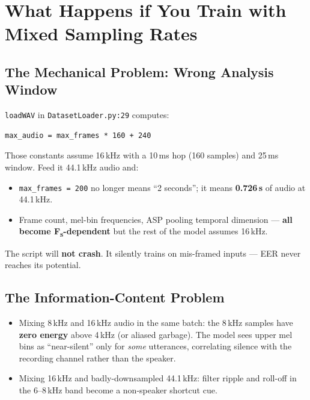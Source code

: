 \documentclass[11pt,a4paper]{article}
\begin{document}
\section{What Happens if You Train with Mixed Sampling Rates}
\label{sec:mixed}

\subsection{The Mechanical Problem: Wrong Analysis Window}

\texttt{loadWAV} in \texttt{DatasetLoader.py:29} computes:

\begin{lstlisting}[style=python]
max_audio = max_frames * 160 + 240
\end{lstlisting}

Those constants assume 16\,kHz with a 10\,ms hop (160 samples) and 25\,ms window. Feed it 44.1\,kHz
audio and:
\begin{itemize}
  \item \texttt{max\_frames = 200} no longer means ``2 seconds''; it means \textbf{0.726\,s} of
    audio at 44.1\,kHz.
  \item Frame count, mel-bin frequencies, ASP pooling temporal dimension --- \textbf{all become
    F\textsubscript{s}-dependent} but the rest of the model assumes 16\,kHz.
\end{itemize}

The script will \textbf{not crash}. It silently trains on mis-framed inputs --- EER never reaches
its potential.

\subsection{The Information-Content Problem}

\begin{itemize}
  \item Mixing 8\,kHz and 16\,kHz audio in the same batch: the 8\,kHz samples have \textbf{zero
    energy} above 4\,kHz (or aliased garbage). The model sees upper mel bins as ``near-silent'' only
    for \emph{some} utterances, correlating silence with the recording channel rather than the speaker.
  \item Mixing 16\,kHz and badly-downsampled 44.1\,kHz: filter ripple and roll-off in the 6--8\,kHz
    band become a non-speaker shortcut cue.
\end{itemize}
\end{document}
